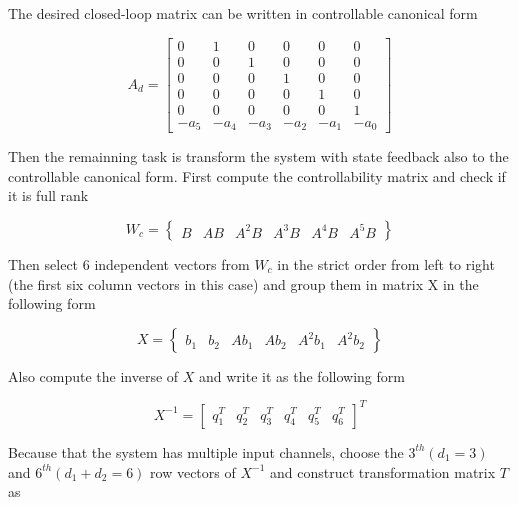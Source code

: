 \documentclass[hyperref]{article}
\theoremstyle{nonumberplain}
\begin{document}
	The desired closed-loop matrix can be written in controllable canonical form
	
	\begin{equation}
	A_{d}=\begin{bmatrix}
	0 &  1&0  &0  &0  &0 \\ 
	0 &0  &1  &0  &0  &0 \\ 
	0 &0  &0  &1  &0  &0 \\ 
	0 &0  &0  &0  &1  &0 \\ 
	0 &0  &0  &0  &0  &1 \\ 
	-a_{5} &-a_{4}  &-a_{3}  & -a_{2} &-a_{1}  & -a_{0}
	\end{bmatrix}
	\label{eq9}
	\end{equation}
	
	Then the remainning task is transform the system with state feedback also to the controllable canonical form. First compute the controllability matrix and check if it is full rank
	
	\begin{equation}
	W_{c}=\begin{Bmatrix}
	B &AB  &A^{2}B  &A^{3}B &A^{4}B  & A^{5}B
	\end{Bmatrix}
	\label{eq10}
	\end{equation}
	
	Then select 6 independent vectors from $W_{c}$ in the strict order from left to right (the first six column vectors in this case) and group them in matrix X in the following form
	
	\begin{equation}
	X=\begin{Bmatrix}
	b_{1} &b_{2}  &Ab_{1}  &Ab_{2}  &A^{2}b_{1}  &A^{2}b_{2} 
	\end{Bmatrix}
	\label{eq11}
	\end{equation}
	
	Also compute the inverse of $X$ and write it as the following form
	
	\begin{equation}
	X^{-1}=\begin{bmatrix}
	q_{1}^{T} & q_{2}^{T} & q_{3}^{T} & q_{4}^{T} & q_{5}^{T} & q_{6}^{T}
	\end{bmatrix}^{T}
	\label{eq12}
	\end{equation}
	
	Because that the system has multiple input channels, choose the $3^{th} (d_{1}=3)$ and $6^{th} (d_{1}+d_{2}=6)$ row vectors of $X^{-1}$ and construct transformation matrix $T$ as
	
\end{document}
